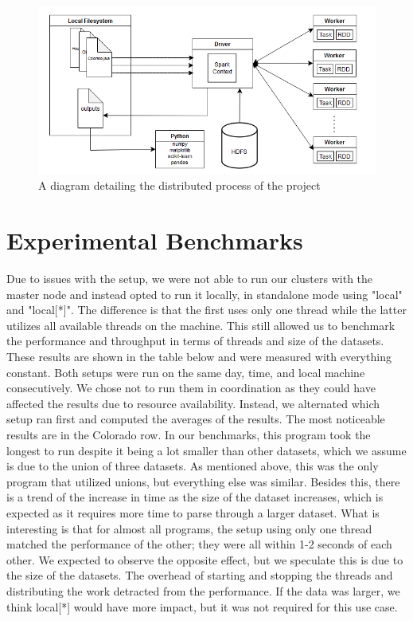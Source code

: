 \documentclass[titlepage]{article}
\begin{document}
\begin{figure}[h]
  \centering
  \includegraphics[width=\linewidth]{uml}
  \caption{A diagram detailing the distributed process of the project}
\end{figure}

\section{Experimental Benchmarks}
Due to issues with the setup, we were not able to run our clusters with the master node and instead opted to run it locally, in standalone mode using "local" and "local[*]". The difference is that the first uses only one thread while the latter utilizes all available threads on the machine. This still allowed us to benchmark the performance and throughput in terms of threads and size of the datasets. These results are shown in the table below and were measured with everything constant. Both setups were run on the same day, time, and local machine consecutively. We chose not to run them in coordination as they could have affected the results due to resource availability. Instead, we alternated which setup ran first and computed the averages of the results. The most noticeable results are in the Colorado row. In our benchmarks, this program took the longest to run despite it being a lot smaller than other datasets, which we assume is due to the union of three datasets. As mentioned above, this was the only program that utilized  unions, but everything else was similar. Besides this, there is a trend of the increase in time as the size of the dataset increases, which is expected as it requires more time to parse through a larger dataset. What is interesting is that for almost all programs, the setup using only one thread matched the performance of the other; they were all within 1-2 seconds of each other. We expected to observe the opposite effect, but we speculate this is due to the size of the datasets. The overhead of starting and stopping the threads and distributing the work detracted from the performance. If the data was larger, we think local[*] would have more impact, but it was not required for this use case.
\end{document}
